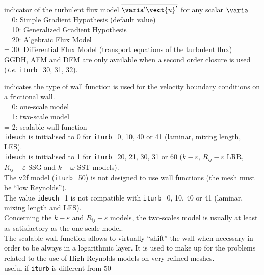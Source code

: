 {indicator of the turbulent flux model $ \overline{\varia^\prime \vect{u}^\prime}$
for any scalar $\varia$\\
\hspace*{1.3cm}= 0: Simple Gradient Hypothesis (default value)\\
\hspace*{1.3cm}= 10: Generalized Gradient Hypothesis\\
\hspace*{1.3cm}= 20: Algebraic Flux Model\\
\hspace*{1.3cm}= 30: Differential Flux Model (transport equations of the turbulent flux)\\
GGDH, AFM and DFM are only available when a second order closure is used ({\em i.e.} {\tt iturb}=30, 31, 32).
}

{indicates the type of wall function is used for
 the velocity boundary conditions on a frictional wall.\\
\hspace*{1.3cm}= 0: one-scale model\\
\hspace*{1.3cm}= 1: two-scale model\\
\hspace*{1.3cm}= 2: scalable wall function\\
{\tt ideuch} is initialised to 0 for {\tt iturb}=0, 10, 40 or 41
(laminar, mixing length, LES).\\
{\tt ideuch} is initialised to 1 for {\tt iturb}=20, 21, 30, 31 or 60
($k-\varepsilon$, $R_{ij}-\varepsilon$ LRR, $R_{ij}-\varepsilon$ SSG and
$k-\omega$ SST models).\\
The v2f model ({\tt iturb}=50) is not designed to use wall functions
(the mesh must be ``low Reynolds'').\\
The value {\tt ideuch}=1 is not compatible with {\tt iturb}=0, 10, 40
or 41 (laminar, mixing length and LES).\\
Concerning the $k-\varepsilon$ and $R_{ij}-\varepsilon$ models, the
two-scales model is usually at least as satisfactory as the one-scale
model.\\
The scalable wall function allows to virtually ``shift'' the wall when
necessary in order to be always in a logarithmic layer.
It is used to make up for
the problems related to the use of High-Reynolds models on very refined
meshes.\\
useful if {\tt iturb} is different from 50}

